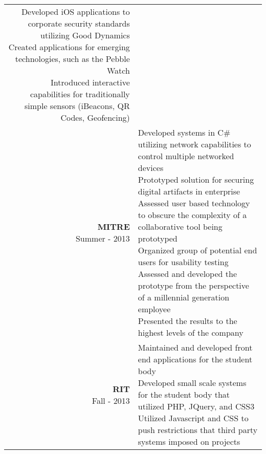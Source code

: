\documentclass{article}
\makeatletter
\newcommand*\lineBr[2][c]{\begin{tabular}[#1]{@{}r@{}}#2\end{tabular}}
\newcommand*\lineBl[2][c]{\begin{tabular}[#1]{@{}l@{}}#2\end{tabular}}
\makeatother
\begin{document}
\begin{tabularx}{\textwidth}{ r | X }
{    Developed iOS applications to corporate security standards utilizing Good Dynamics \\
    Created applications for emerging technologies, such as the Pebble Watch \\
    Introduced interactive capabilities for traditionally simple sensors (iBeacons, QR Codes, Geofencing) \\
  } \\
  \vspace{2mm}
  \hspace{6mm}
  \lineBr{ {\large {\bf MITRE }\\Summer - 2013}} &
  \lineBl{
    Developed systems in C\# utilizing network capabilities to control multiple networked devices \\
    Prototyped solution for securing digital artifacts in enterprise \\
    Assessed user based technology to obscure the complexity of a collaborative tool being prototyped \\
    Organized group of potential end users for usability testing \\
    Assessed and developed the prototype from the perspective of a millennial generation employee \\
    Presented the results to the highest levels of the company \\
  } \\
  \vspace{2mm}
  \hspace{6mm}
  \lineBr{ {\large {\bf RIT }\\Fall - 2013}} &
  \lineBl{
    Maintained and developed front end applications for the student body \\
    Developed small scale systems for the student body that utilized PHP, JQuery, and CSS3 \\
    Utilized Javascript and CSS to push restrictions that third party systems imposed on projects \\
  }
\end{tabularx}
\end{document}
